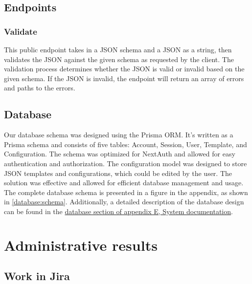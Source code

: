 \subsection{Endpoints}

\subsubsection{Validate}

This public endpoint takes in a JSON schema and a JSON as a string, then validates the JSON against the given schema as requested by the client. The validation process determines whether the JSON is valid or invalid based on the given schema. If the JSON is invalid, the endpoint will return an array of errors and paths to the errors. 

\subsection{Database}


Our database schema was designed using the Prisma ORM. It's written as a Prisma schema and consists of five tables: Account, Session, User, Template, and Configuration. The schema was optimized for NextAuth and allowed for easy authentication and authorization. The configuration model was designed to store JSON templates and configurations, which could be edited by the user. The solution was effective and allowed for efficient database management and usage. \\

\noindent
The complete database schema is presented in a figure in the appendix, as shown in 
\autoref{database:schema}.
Additionally, a detailed description of the database design can be found in the \hyperref[chap:database-schema]{database section of appendix E, System documentation}. 


\section{Administrative results}

\subsection{Work in Jira}

